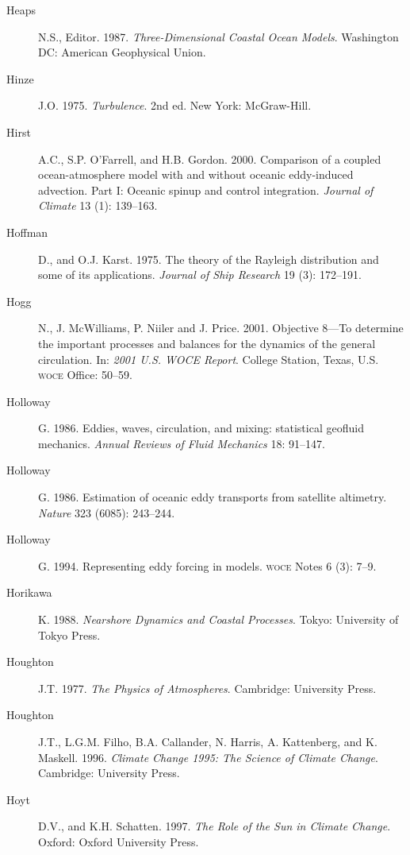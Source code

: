 \begin{description}
\item [Heaps]N.S., Editor. 1987. \textit{Three-Dimensional Coastal
  Ocean Models}.  Washington DC: American Geophysical Union.

\item [Hinze]J.O. 1975. \textit{Turbulence}. 2nd ed. New York:
  McGraw-Hill.

\item [Hirst]A.C., S.P. O'Farrell, and H.B. Gordon. 2000. Comparison
  of a coupled ocean-atmosphere model with and without oceanic
  eddy-induced advection.  Part I: Oceanic spinup and control
  integration. \textit{Journal of Climate} 13 (1): 139--163.

\item [Hoffman]D., and O.J. Karst. 1975. The theory of the Rayleigh
  distribution and some of its applications. \textit{Journal of Ship
    Research} 19 (3): 172--191.

\item [Hogg]N., J. McWilliams, P. Niiler and J. Price. 2001. Objective
  8---To determine the important processes and balances for the
  dynamics of the general circulation. In: \textit{2001 U.S. WOCE
    Report}. College Station, Texas, U.S. \textsc{woce} Office:
  50--59.

\item [Holloway]G. 1986. Eddies, waves, circulation, and mixing:
  statistical geofluid mechanics. \textit{Annual Reviews of Fluid
    Mechanics} 18: 91--147.

\item [Holloway]G. 1986. Estimation of oceanic eddy transports from
  satellite altimetry. \textit{Nature} 323 (6085): 243--244.

\item [Holloway]G. 1994. Representing eddy forcing in
  models. \textsc{woce} Notes 6 (3): 7--9.

\item [Horikawa]K. 1988. \textit{Nearshore Dynamics and Coastal
  Processes}.  Tokyo: University of Tokyo Press.

\item [Houghton]J.T. 1977. \textit{The Physics of
  Atmospheres}. Cambridge: University Press.

\item [Houghton]J.T., L.G.M. Filho, B.A. Callander, N. Harris,
  A. Kattenberg, and K. Maskell. 1996. \textit{Climate Change 1995:
    The Science of Climate Change}. Cambridge: University Press.

\item [Hoyt]D.V., and K.H. Schatten. 1997. \textit{The Role of the Sun
  in Climate Change}.  Oxford: Oxford University Press.


\end{description}

